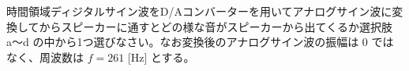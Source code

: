 時間領域ディジタルサイン波をD/Aコンバーターを用いてアナログサイン波に変換してからスピーカーに通すとどの様な音がスピーカーから出てくるか選択肢 a〜d の中から1つ選びなさい。なお変換後のアナログサイン波の振幅は $0$ ではなく、周波数は $f = 261$ [Hz] とする。

